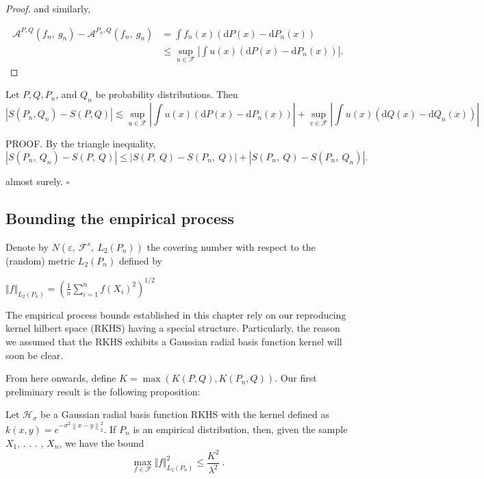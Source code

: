 \begin{proof}
		and similarly,
		
		\begin{align*}
			\mathcal{A}^{P,Q}(f_n,\ g_n)-\mathcal{A}^{P_{n},Q}(f_n,\ g_n) &=\int f_n(x)(\mathrm{d}P(x)-\mathrm{d}P_{n}(x)) \\
			&\leq\sup_{u\in \mathcal{F}}|\int u(x)(\mathrm{d}P(x)-\mathrm{d}P_{n}(x))|.
		\end{align*}
		
	\end{proof}
	
	\begin{corollary}
		
		Let $P, Q, P_{n}$, and $Q_{n}$ be probability distributions. Then
		$$|S(P_{n}, Q_{n})-S(P, Q)| \lesssim \sup_{u\in \mathcal{F}}|\int u(x)(\mathrm{d}P(x)-\mathrm{d}P_{n}(x))|
		+\sup_{v\in \mathcal{F}}|\int u(x)(\mathrm{d}Q(x)-\mathrm{d}Q_{n}(x))|
		$$
	\end{corollary}
	
	PROOF. By the triangle inequality,
	$$|S(P_{n},\ Q_{n})-S(P,\ Q)|\leq|S(P,\ Q)-S(P_{n},\ Q)|+|S(P_{n},\ Q)-S(P_{n},\ Q_{n})|.$$
	
	almost surely. $\square $
	\medskip
	
	\subsection*{Bounding the empirical process}
	Denote by $N(\varepsilon,\ \mathcal{F}^{s},\ L_{2}(P_{n}))$ the covering number with respect to the (random) metric $L_{2}(P_{n})$ defined by
	
	$\displaystyle \Vert f\Vert_{L_{2}(P_{n})}=\left(\frac{1}{n}\sum_{i=1}^{n}f(X_{i})^{2}\right)^{1/2}$
	
	The empirical process bounds established in this chapter rely on our reproducing kernel hilbert space (RKHS) having a special structure. Particularly, the reason we assumed that the RKHS exhibits a Gaussian radial basis function kernel will soon be clear.
	
	From here onwards, define $K=\max(K(P,Q),K(P_n,Q))$. Our first preliminary result is the following proposition:
	
	\begin{prop}
		Let $\mathcal{H}_{\sigma}$ be a Gaussian radial basis function RKHS with the kernel defined as $k(x,y)=e^{-\sigma^2 \left\|x-y\right\|_2^2}$. If $P_{n}$ is an empirical distribution, then, given the sample $X_{1}$, . . . , $X_{n}$, we have the bound
		$$
		\max_{f\in \mathcal{F}} \Vert f\Vert_{L_{2}(P_{n})}^{2}\leq \frac{K^2}{\lambda^2}\ .
		$$ 
	\end{prop}
	
